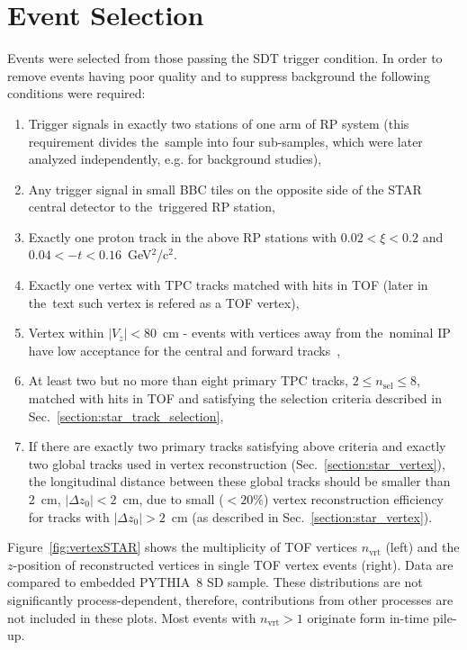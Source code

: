 \section{Event Selection}\label{section:star_event_selection}
Events were selected from those passing the SDT trigger condition. In order to remove events having poor quality and to suppress background the following conditions were required:
\begin{enumerate}
	\item Trigger signals in exactly two stations of one arm of \ac{RP} system (this requirement divides the~sample into four  sub-samples, which were later analyzed independently, e.g. for background studies),
	\item Any trigger signal in small BBC tiles on the opposite side of the STAR central detector to the~triggered RP station,
	\item Exactly one proton track in the above RP stations with $0.02 < \xi < 0.2$ and $0.04 < -t < 0.16$~GeV$^{2}$/c$^{2}$. 
	\item Exactly one  vertex with TPC tracks matched with hits in TOF (later in the~text such vertex  is refered as a TOF vertex),
	\item Vertex  within $|V_z|<80$~cm - events with vertices away from the~nominal IP have low acceptance for the central and forward tracks~\cite{supplementaryNote},
	\item At least two but no more than eight primary TPC tracks, $2\leq n_{\textrm{sel}}\leq 8$, matched with hits in TOF and satisfying the selection criteria described in Sec.~\ref{section:star_track_selection},
	\item If there are exactly two primary tracks satisfying above criteria and exactly two global tracks used in vertex reconstruction (Sec.~\ref{section:star_vertex}), the longitudinal distance between these global tracks should be smaller than $2$~cm, $|\Delta z_0|<2$~cm, due to small ($<20\%$) vertex reconstruction efficiency for tracks with $|\Delta z_0|>2$~cm (as described in Sec.~\ref{section:star_vertex}).
\end{enumerate}
Figure~\ref{fig:vertexSTAR} shows the multiplicity of TOF vertices  $n_\textrm{vrt}$ (left)  and the $z$-position of  reconstructed vertices in single TOF vertex events (right). Data are compared to embedded PYTHIA~8 SD sample. These distributions are not significantly process-dependent, therefore, contributions from other processes are not included in these plots. Most events with $n_\textrm{vrt} > 1$ originate form in-time pile-up.


